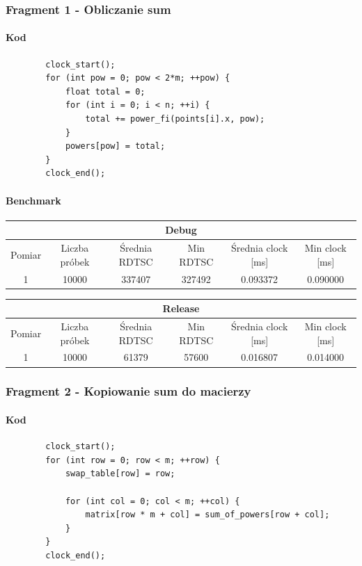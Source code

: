 \documentclass{article}
\begin{document}
	\subsubsection{Fragment 1 - Obliczanie sum}
	\paragraph{Kod}
	\begin{verbatim}
		clock_start();
		for (int pow = 0; pow < 2*m; ++pow) {
			float total = 0;
			for (int i = 0; i < n; ++i) {
				total += power_fi(points[i].x, pow);
			}
			powers[pow] = total;
		}
		clock_end();
	\end{verbatim}
	\paragraph{Benchmark}
	\begin{center}
		\begin{tabular}{|c|c|c|c|c|c|} \hline
			\multicolumn{6}{|c|}{Debug} \\\hline
			Pomiar  & Liczba próbek & Średnia RDTSC & Min RDTSC & Średnia clock [ms] & Min clock [ms] \\\hline
			\hline
			1 & 10000 & 337407 & 327492 & 0.093372 & 0.090000 \\\hline
			
		\end{tabular}
	\end{center}
	\begin{center}
		\begin{tabular}{|c|c|c|c|c|c|} \hline
			\multicolumn{6}{|c|}{Release} \\\hline
			Pomiar  & Liczba próbek & Średnia RDTSC & Min RDTSC & Średnia clock [ms] & Min clock [ms] \\\hline
			\hline
			1 & 10000 & 61379 & 57600 & 0.016807 & 0.014000 \\\hline
			
		\end{tabular}
	\end{center}
	
	\subsubsection{Fragment 2 - Kopiowanie sum do macierzy}
	\paragraph{Kod}
	\begin{verbatim}
		clock_start();
		for (int row = 0; row < m; ++row) {
			swap_table[row] = row;
			
			for (int col = 0; col < m; ++col) {
				matrix[row * m + col] = sum_of_powers[row + col];
			}
		}
		clock_end();
	\end{verbatim}
\end{document}
